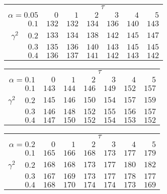 \begin{tabular}{r|rrrrrr}
\hline\hline
 &\multicolumn{6}{c}{$\tau$} \\ 
 $\alpha = 0.05$ & $0$ & $1$ & $2$ & $3$ & $4$ & $5$ \\ 
 \hline$0.1$ & $132$ & $132$ & $134$ & $136$ & $140$ & $143$\\ 
$\gamma^2\;\;\;$ $0.2$ & $133$ & $134$ & $138$ & $142$ & $145$ & $147$\\ 
$0.3$ & $135$ & $136$ & $140$ & $143$ & $145$ & $145$\\ 
$0.4$ & $136$ & $137$ & $141$ & $142$ & $143$ & $142$\\ 
 \hline 
 \end{tabular}
 
 \vspace{2em} 
 
\begin{tabular}{r|rrrrrr}
\hline\hline
 &\multicolumn{6}{c}{$\tau$} \\ 
 $\alpha = 0.1$ & $0$ & $1$ & $2$ & $3$ & $4$ & $5$ \\ 
 \hline$0.1$ & $143$ & $144$ & $146$ & $149$ & $152$ & $157$\\ 
$\gamma^2\;\;\;$ $0.2$ & $145$ & $146$ & $150$ & $154$ & $157$ & $159$\\ 
$0.3$ & $146$ & $148$ & $152$ & $155$ & $156$ & $157$\\ 
$0.4$ & $147$ & $150$ & $152$ & $154$ & $153$ & $152$\\ 
 \hline 
 \end{tabular}
 
 \vspace{2em} 
 
\begin{tabular}{r|rrrrrr}
\hline\hline
 &\multicolumn{6}{c}{$\tau$} \\ 
 $\alpha = 0.2$ & $0$ & $1$ & $2$ & $3$ & $4$ & $5$ \\ 
 \hline$0.1$ & $165$ & $166$ & $168$ & $173$ & $177$ & $179$\\ 
$\gamma^2\;\;\;$ $0.2$ & $168$ & $168$ & $173$ & $177$ & $180$ & $182$\\ 
$0.3$ & $167$ & $169$ & $173$ & $177$ & $178$ & $177$\\ 
$0.4$ & $168$ & $170$ & $174$ & $174$ & $173$ & $169$\\ 
 \hline 
 \end{tabular}